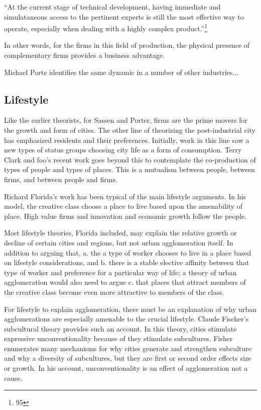 ``At the current stage of technical development, having immediate and
simulataneous access to the pertinent experts is still the most
effective way to operate, especially when dealing with a highly
complex product.''\footnote{95}

In other words, for the firms in this field of production, the
physical presence of complementary firms provides a business
advantage.

Michael Porte identifies the same dynamic in a number of other
industries...

\subsection{Lifestyle}
Like the earlier theorists, for Sassen and Porter, firms are the prime
movers for the growth and form of cities. The other line of theorizing
the post-industrial city has emphasized residents and their
preferences. Initially, work in this line saw a new types of status
groups choosing city life as a form of consumption. Terry Clark and
foo's recent work goes beyond this to contemplate the co-production of
types of people and types of places. This is a mutualism between
people, between firms, and between people and firms.

Richard Florida's work has been typical of the main lifestyle
arguments. In his model, the creative class choose a place to live
based upon the amenability of place. High value firms and innovation
and economic growth follow the people. 

Most lifestyle theories, Florida included, may explain the relative
growth or decline of certain cities and regions, but not urban
agglomeration itself. In addition to arguing that, a. the a type of
worker chooses to live in a place based on lifestyle considerations,
and b. there is a stable elective affinity between that type of worker
and preference for a particular way of life; a theory of urban
agglomeration would also need to argue c. that places that attract
members of the creative class become even more attractive to members
of the class. 

For lifestyle to explain agglomeration, there must be an explanation of
why urban agglomerations are especially amenable to the crucial
lifestyle. Claude Fischer's subcultural theory provides such an
account. In this theory, cities stimulate expressive
unconventionality because of they stimulate subcultures. Fisher
enumerates many mechanisms for why cities generate and strengthen
subculture and why a diversity of subcultures, but they are first or
second order effects size or growth. In his account, unconventionality
is an effect of agglomeration not a cause.

